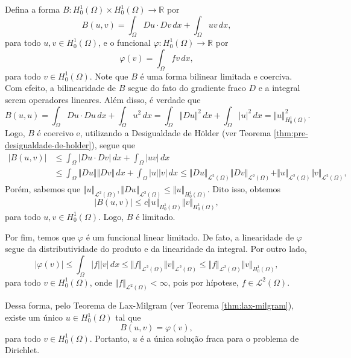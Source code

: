 \documentclass[a4paper, 11pt]{book}
\theoremstyle{definition}
\newcommand{\bR}{\mathbb{R}}
\newcommand{\cL}{\mathcal{L}}
\begin{document}
Defina a forma $B : H^1_0(\Omega) \times H^1_0(\Omega) \to \bR$ por
\[
    B(u,v)=\int_\Omega Du \cdot Dv \,dx + \int_{\Omega} uv \,dx,
\]
para todo $u, v \in H^1_0(\Omega)$,
e o funcional $\varphi : H^1_0(\Omega) \to \bR$ por
\[
    \varphi(v) = \int_\Omega fv \,dx,
\]
para todo $v \in H^1_0(\Omega)$.
Note que $B$ é uma forma bilinear limitada e coerciva. Com efeito, a bilinearidade de $B$ segue do fato do gradiente fraco $D$ e a integral serem operadores lineares. Além disso, é verdade que
\[
    B(u,u) = \int_\Omega Du \cdot Du \,dx + \int_\Omega u^2 \,dx
    = \int_\Omega \Vert Du \Vert^2 \,dx + \int_\Omega |u|^2 \,dx 
    = \Vert u \Vert_{H^1_0(\Omega)}^2.
\]
Logo, $B$ é coercivo e, utilizando a Desigualdade de Hölder (ver Teorema \ref{thm:pre-desigualdade-de-holder}), segue que
\[
    \begin{aligned}
        |B(u,v)| &\leqslant \int_\Omega |Du \cdot Dv | \,dx + \int_\Omega |u v | \,dx\\ &\leqslant \int_\Omega \Vert Du \Vert \Vert Dv \Vert \,dx + \int_\Omega |u| |v| \,dx \leqslant \Vert Du \Vert_{\cL^2(\Omega)}\Vert Dv \Vert_{\cL^2(\Omega)} + \Vert u \Vert_{\cL^2(\Omega)}\Vert v \Vert_{\cL^2(\Omega)},
    \end{aligned}
\]
Porém, sabemos que $\Vert u \Vert_{\cL^2(\Omega)}, \Vert Du \Vert_{\cL^2(\Omega)} \leqslant \Vert u \Vert_{H^1_0(\Omega)}$.
Dito isso, obtemos
\[
    |B(u,v)| \leqslant c \Vert u \Vert_{H^1_0(\Omega)} \Vert v \Vert_{H^1_0(\Omega)},
\]
para todo $u, v \in H^1_0(\Omega)$. Logo, $B$ é limitado.

Por fim, temos que $\varphi$ é um funcional linear limitado.
De fato, a linearidade de $\varphi$ segue da distributividade do produto e da linearidade da integral.
Por outro lado,
\[
    |\varphi(v)| \leqslant \int_\Omega |f| |v| \,dx \leqslant \Vert f \Vert_{\cL^2(\Omega)} \Vert v \Vert_{\cL^2(\Omega)} \leqslant \Vert f \Vert_{\cL^2(\Omega)} \Vert v \Vert_{H^1_0(\Omega)},
\]
para todo $v \in H^1_0(\Omega)$, onde $\Vert f \Vert_{\cL^2(\Omega)} < \infty$, pois por hípotese, $f \in \cL^2(\Omega)$.

Dessa forma, pelo Teorema de Lax-Milgram (ver Teorema \ref{thm:lax-milgram}), existe um único $u \in H^1_0(\Omega)$ tal que
\[
    B(u,v) = \varphi(v),
\]
para todo $v \in H^1_0(\Omega)$.
Portanto, $u$ é a única solução fraca para o problema de Dirichlet.

\nocite{*}
\printbibliography
\end{document}
